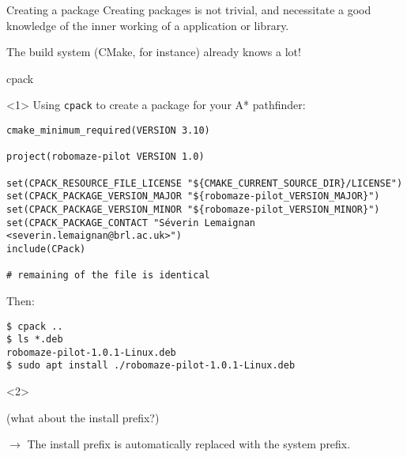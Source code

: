 \documentclass[compress]{beamer}
\begin{document}

\begin{frame}{Creating a package}
    Creating packages is not trivial, and necessitate a good knowledge of the
    inner working of a application or library.

    \pause

    The build system (CMake, for instance) already knows a lot!

\end{frame}

\begin{frame}[fragile]{cpack}
\begin{onlyenv}<1>
    Using \texttt{cpack} to create a package for your A* pathfinder:

\begin{verbatim}
cmake_minimum_required(VERSION 3.10)

project(robomaze-pilot VERSION 1.0)

set(CPACK_RESOURCE_FILE_LICENSE "${CMAKE_CURRENT_SOURCE_DIR}/LICENSE")
set(CPACK_PACKAGE_VERSION_MAJOR "${robomaze-pilot_VERSION_MAJOR}")
set(CPACK_PACKAGE_VERSION_MINOR "${robomaze-pilot_VERSION_MINOR}")
set(CPACK_PACKAGE_CONTACT "Séverin Lemaignan <severin.lemaignan@brl.ac.uk>")
include(CPack)

# remaining of the file is identical
\end{verbatim}

Then:

\begin{verbatim}
$ cpack ..
$ ls *.deb
robomaze-pilot-1.0.1-Linux.deb
$ sudo apt install ./robomaze-pilot-1.0.1-Linux.deb
\end{verbatim}
    \end{onlyenv}
    \begin{onlyenv}<2>

        (what about the install prefix?)


$\rightarrow$ The install prefix is automatically replaced with the system prefix.
    \end{onlyenv}

\end{frame}
\end{document}
